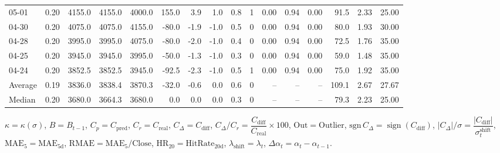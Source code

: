 \begin{threeparttable}
{\begin{tabular}{lrrrrrrrrrrrrrrr}
  05-01 &     0.20 & 4155.0 & 4155.0 & 4000.0 &      155.0 &            3.9 &                      1.0 &                 0.8 &              1 &       0.00 &      0.94 &           0.00 &             91.5 &            2.33 &                  25.00 \\
  04-30 &     0.20 & 4075.0 & 4075.0 & 4155.0 &      -80.0 &           -1.9 &                     -1.0 &                 0.5 &              0 &       0.00 &      0.94 &           0.00 &             80.0 &            1.93 &                  30.00 \\
  04-28 &     0.20 & 3995.0 & 3995.0 & 4075.0 &      -80.0 &           -2.0 &                     -1.0 &                 0.4 &              0 &       0.00 &      0.94 &           0.00 &             72.5 &            1.76 &                  35.00 \\
  04-25 &     0.20 & 3945.0 & 3945.0 & 3995.0 &      -50.0 &           -1.3 &                     -1.0 &                 0.3 &              0 &       0.00 &      0.94 &           0.00 &             59.0 &            1.48 &                  35.00 \\
  04-24 &     0.20 & 3852.5 & 3852.5 & 3945.0 &      -92.5 &           -2.3 &                     -1.0 &                 0.5 &              1 &       0.00 &      0.94 &           0.00 &             75.0 &            1.92 &                  35.00 \\
Average &     0.19 & 3836.0 & 3838.4 & 3870.3 &      -32.0 &           -0.6 &                      0.0 &                 0.6 &              0 &         -- &        -- &             -- &            109.1 &            2.67 &                  27.67 \\
 Median &     0.20 & 3680.0 & 3664.3 & 3680.0 &        0.0 &            0.0 &                      0.0 &                 0.3 &              0 &         -- &        -- &             -- &             79.3 &            2.23 &                  25.00 \\
\bottomrule
\end{tabular}
}
\begin{tablenotes}\footnotesize
\item $\kappa=\kappa(\sigma)$, $B=B_{t-1}$, $C_p=C_{\text{pred}}$, $C_r=C_{\text{real}}$, $C_\Delta=C_{\text{diff}}$, $C_\Delta/C_r=\dfrac{C_{\text{diff}}}{C_{\text{real}}}\times100$, $\mathrm{Out}=\text{Outlier}$, $\mathrm{sgn}\,C_\Delta=\operatorname{sign}(C_{\text{diff}})$, $|C_\Delta|/\sigma=\dfrac{|C_{\text{diff}}|}{\sigma_t^{\text{shift}}}$, $\mathrm{MAE}_5=\mathrm{MAE}_{5\text{d}}$, $\mathrm{RMAE}= \mathrm{MAE}_5 / \text{Close}$, $\mathrm{HR}_{20}=\mathrm{HitRate}_{20\text{d}}$, 
$\lambda_{\text{shift}}=\lambda_t$, 
$\Delta\alpha_t=\alpha_t-\alpha_{t-1}$.
\end{tablenotes}
\end{threeparttable}
\endgroup


